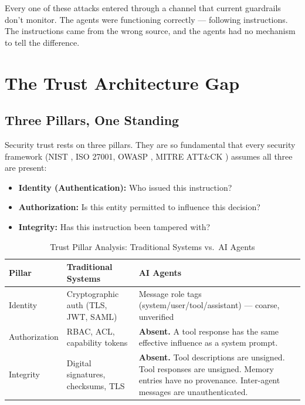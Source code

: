 \documentclass[11pt,letterpaper]{article}
\begin{document}
Every one of these attacks entered through a channel that current guardrails don't monitor. The agents were functioning correctly --- following instructions. The instructions came from the wrong source, and the agents had no mechanism to tell the difference.


\section{The Trust Architecture Gap}
\label{sec:trustgap}

\subsection{Three Pillars, One Standing}

Security trust rests on three pillars. They are so fundamental that every security framework (NIST \cite{nist}, ISO 27001, OWASP \cite{owaspllm,owaspagentic}, MITRE ATT\&CK \cite{mitreatlas}) assumes all three are present:

\begin{itemize}
\item \textbf{Identity (Authentication):} Who issued this instruction?
\item \textbf{Authorization:} Is this entity permitted to influence this decision?
\item \textbf{Integrity:} Has this instruction been tampered with?
\end{itemize}

\begin{table}[htbp]
\centering
\caption{Trust Pillar Analysis: Traditional Systems vs.\ AI Agents}
\label{tab:pillars}
\begin{tabularx}{\textwidth}{lXX}
\toprule
\textbf{Pillar} & \textbf{Traditional Systems} & \textbf{AI Agents} \\
\midrule
Identity & Cryptographic auth (TLS, JWT, SAML) & Message role tags (system/user/tool/assistant) --- coarse, unverified \\
Authorization & RBAC, ACL, capability tokens & \textbf{Absent.} A tool response has the same effective influence as a system prompt. \\
Integrity & Digital signatures, checksums, TLS & \textbf{Absent.} Tool descriptions are unsigned. Tool responses are unsigned. Memory entries have no provenance. Inter-agent messages are unauthenticated. \\
\bottomrule
\end{tabularx}
\end{table}
\end{document}
